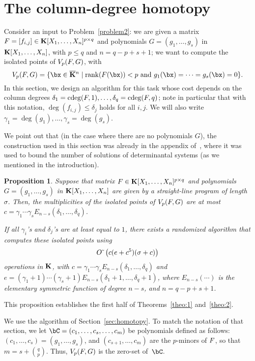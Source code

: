 \documentclass[12pt]{article}
\newtheorem{proposition}[definition]{Proposition}
\begin{document}
\section{The column-degree homotopy}\label{sec:columndegree}

Consider an input to Problem~\ref{problem2}: we are given a matrix
${F} =[f_{i,j}]\in \mathbf{K}[X_1,\dots,X_n]^{p \times q}$ and polynomials
$G=(g_1,\dots,g_s)$ in $\mathbf{K}[X_1,\dots,X_n]$, with $p \leq q$ and $n =
q-p+s+1$; we want to compute the isolated points of $V_{p}({F},G)$,
with
$$\VpFG{p}{\mF}{G} = \{\bx \in \KKbar{}^n \mid  \mathrm{rank}(\mF({\bx})) < p
\text{~and~} g_1(\bx)=\cdots=g_s(\bx)=0\}.$$
In this section, we design an algorithm for this task whose cost
depends on the column degrees
$\delta_1=\mathrm{cdeg}({F},1),\dots,\delta_q=\mathrm{cdeg}({F},q)$; note in
particular that with this notation, $\deg(f_{i,j}) \leq \delta_j$
holds for all $i,j$.  We will also write
$\gamma_1=\deg(g_1),\dots,\gamma_s=\deg(g_s)$. 

We point out that (in the case where there are no polynomials $G$),
the construction used in this section was already in the appendix
of~\cite{NieRan09}, where it was used to bound the number of solutions
of determinantal systems (as we mentioned in the introduction).

\begin{proposition}\label{prop:coldeg}
  Suppose that matrix
  ${F} \in \mathbf{K}[X_1,\dots,X_n]^{p \times q}$ and polynomials
  $G=(g_1,\dots,g_s)$ in $\mathbf{K}[X_1,\dots,X_n]$ are given by a
  straight-line program of length $\sigma$. Then, the multiplicities of
  the isolated points of $V_{p}({F},G)$ are at most $c=\gamma_1\cdots\gamma_sE_{n-s}(\delta_1, \ldots, \delta_q)$.

  If all $\gamma_i$'s and $\delta_j$'s are at least equal to $1$, there exists  
  a randomized algorithm that computes these isolated points  using $${O}{\,\tilde{ }\,}\left (c(e+c^5 )(\sigma + c)\right)$$
  operations in $\mathbf{K}$, with
  $c=\gamma_1\cdots\gamma_sE_{n-s}(\delta_1, \ldots, \delta_q)$ and
  $e=(\gamma_1+1)\cdots(\gamma_s+1) E_{n-s}(\delta_1+1, \ldots,
  \delta_q+1)$,
  where $E_{n-s}(\cdots)$ is the elementary symmetric 
  function of degree $n-s$, and $n=q-p+s+1$.
\end{proposition}
This proposition establishes the first half of Theorems~\ref{theo:1}
and~\ref{theo:2}. 

\medskip

We use the algorithm of Section~\ref{sec:homotopy}. To match the
notation of that section, we let $\bC=(c_1,\dots,c_{s},\dots,c_m)$ be
polynomials defined as follows: $(c_1,\dots,c_{s})=(g_1,\dots,g_s)$,
and $(c_{s+1},\dots,c_{m})$ are the $p$-minors of ${F}$, so that 
$m=s+{q \choose p}$. Thus, $V_{p}({F},G)$ is the zero-set of~$\bC$.
\end{document}
